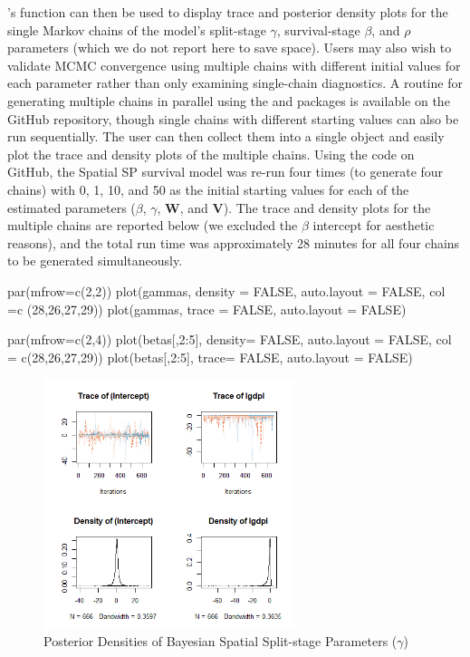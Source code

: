 \noindent {}'s  function can then be used to display trace and posterior density plots for the single Markov chains of the model's split-stage $\gamma$, survival-stage $\beta$, and $\rho$ parameters (which we do not report here to save space). Users may also wish to validate MCMC convergence using multiple chains with different initial values for each parameter rather than only examining single-chain diagnostics. A routine for generating multiple chains in parallel using the  \citep{doparallel} and  \citep{dorng} packages is available on the  GitHub repository, though single chains with different starting values can also be run sequentially. The user can then collect them into a single  object and easily plot the trace and density plots of the multiple chains. Using the code on GitHub, the Spatial SP survival model was re-run four times (to generate four chains) with 0, 1, 10, and 50 as the initial starting values for each of the estimated parameters ($\beta$, $\gamma$, $\textbf{W}$, and $\textbf{V}$). The trace and density plots for the multiple chains are reported below (we excluded the $\beta$ intercept for aesthetic reasons), and the total run time was approximately 28 minutes for all four chains to be generated simultaneously. 

\begin{example}
par(mfrow=c(2,2))
plot(gammas, density = FALSE, auto.layout = FALSE, col =c (28,26,27,29))
plot(gammas, trace = FALSE, auto.layout = FALSE)

par(mfrow=c(2,4))
plot(betas[,2:5], density= FALSE, auto.layout = FALSE, col = c(28,26,27,29))
plot(betas[,2:5], trace= FALSE, auto.layout = FALSE)
\end{example}


\begin{figure}[!htb]
\begin{center}
\includegraphics[width=0.65\textwidth]{figures/gammamultiple.png}

\end{center}
\caption{Posterior Densities of Bayesian Spatial Split-stage Parameters ($\gamma$)}
\label{figurey}
\end{figure}



